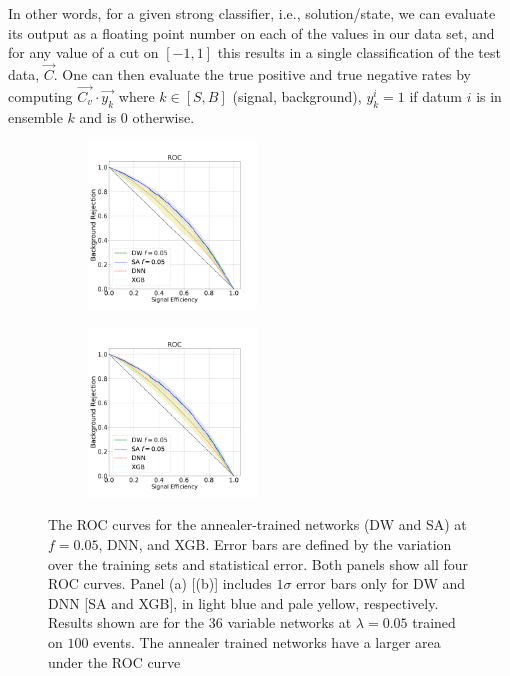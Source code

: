 \documentclass[.chapters/Higgs/.chapters/Higgs/main.tex]{subfiles}
\begin{document}
In other words, for a given strong classifier, i.e., solution/state, we can evaluate its output as a floating point number on each of the values in our data set, and for any value of a cut on $[-1,1]$ this results in a single classification of the test data, $\vec{C}$. One can then evaluate the true positive and true negative rates by computing $\vec{C_v}\cdot\vec{y_k}$ where $k\in [S,B]$ (signal, background), $y_k^i=1$ if datum $i$ is in ensemble $k$ and is $0$ otherwise. 

\begin{figure}
\centering
\begin{subfigure}
  \centering
  \includegraphics[width=0.49\textwidth]{chapters/Higgs/ROC_example_100DWDNN}
\end{subfigure}%
\begin{subfigure}
  \centering
\includegraphics[width=0.49\textwidth]{ROC_example_100SAXGB}\end{subfigure}
  \caption{The ROC curves for the annealer-trained networks (DW and SA) at $f=0.05$, DNN, and XGB. Error bars are defined by the variation over the training sets and statistical error. Both panels show all four ROC curves. Panel (a) [(b)] includes $1\sigma$ error bars only for DW and DNN [SA and XGB], in light blue and pale yellow, respectively. Results shown are for the $36$ variable networks at $\lambda=0.05$ trained on $100$ events. The annealer trained networks have a larger area under the ROC curve}
 \label{fig:ROC_example}
  \end{figure}
\end{document}
